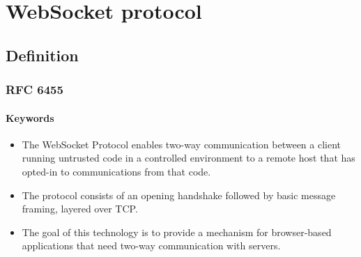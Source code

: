 \documentclass{beamer}
\begin{document}
\section{WebSocket protocol}

\subsection{Definition}
\begin{frame}
    \frametitle{RFC 6455}
    \framesubtitle{Keywords}
    \begin{itemize}[<+->]
        \item The WebSocket Protocol enables \alert<+->{two-way communication} between a
              \alert<+->{client} running untrusted code in a controlled environment to a
              \alert<+->{remote host} that has \alert<+->{opted-in} to communications from
              that code. 
        \item The protocol consists of an opening \alert<+->{handshake} followed by basic
              \alert<+->{message framing}, layered over \alert<+->{TCP}.   
        \item The goal of this technology is to provide a mechanism for
              \alert<+->{browser-based} applications that need two-way communication with
              servers.
    \end{itemize}
\end{frame}
\end{document}
